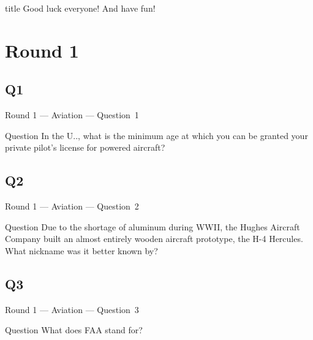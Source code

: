 \documentclass[11pt]{beamer}
\begin{document}
\begingroup{}
\begin{frame}
    \vfill{}
    \begin{beamercolorbox}[sep=8pt,center,shadow=true,rounded=true]{title}
        Good luck everyone! And have fun!
    \end{beamercolorbox}
    \vfill{}
\end{frame}
\endgroup{}
\def\thisSectionName{Aviation}
\section{Round 1}
\subsection*{Q1}
\begin{frame}[t]{Round 1 --- Aviation --- \mbox{Question 1}}
    \vspace{-0.5em}
    \begin{block}{Question}
        In the U.\@S.\@, what is the minimum age at which you can be granted your private pilot's license for powered aircraft?
    \end{block}
\end{frame}
\subsection*{Q2}
\begin{frame}[t]{Round 1 --- Aviation --- \mbox{Question 2}}
    \vspace{-0.5em}
    \begin{block}{Question}
        Due to the shortage of aluminum during WWII, the Hughes Aircraft Company built an almost entirely wooden aircraft prototype, the H-4 Hercules. What nickname was it better known by?
    \end{block}
\end{frame}
\subsection*{Q3}
\begin{frame}[t]{Round 1 --- Aviation --- \mbox{Question 3}}
    \vspace{-0.5em}
    \begin{block}{Question}
        What does FAA stand for?
    \end{block}
\end{frame}
\end{document}
